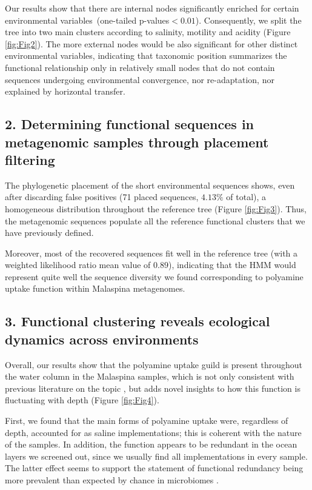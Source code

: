 \documentclass[Journal,letterpaper,NoLists]{ascelike-new}
\begin{document}
Our results show that there are internal nodes significantly enriched for certain environmental variables~(one-tailed p-values$<0.01$). Consequently, we split the tree into two main clusters according to salinity, motility and acidity (Figure \ref{fig:Fig2}). The more external nodes would be also significant for other distinct environmental variables, indicating that taxonomic position summarizes the functional relationship only in relatively small nodes that do not contain sequences undergoing environmental convergence, nor re-adaptation, nor explained by horizontal transfer.


\subsection{2. Determining functional sequences in metagenomic samples through placement filtering}

The phylogenetic placement of the short environmental sequences shows, even after discarding false positives (71 placed sequences, $4.13\%$ of total), a homogeneous distribution throughout the reference tree (Figure \ref{fig:Fig3}). Thus, the metagenomic sequences populate all the reference functional clusters that we have previously defined.

Moreover, most of the recovered sequences fit well in the reference tree (with a weighted likelihood ratio mean value of $0.89$), indicating that the HMM would represent quite well the sequence diversity we found corresponding to polyamine uptake function within Malaspina metagenomes.


\subsection{3. Functional clustering reveals ecological dynamics across environments}

Overall, our results show that the polyamine uptake guild is present throughout the water column in the Malaspina samples, which is not only consistent with previous literature on the topic \cite{bergauer2018organic}, but adds novel insights to how this function is fluctuating with depth (Figure \ref{fig:Fig4}). 

First, we found that the main forms of polyamine uptake were, regardless of depth, accounted for as saline implementations; this is coherent with the nature of the samples. In addition, the function appears to be redundant in the ocean layers we screened out, since we usually find all implementations in every sample. The latter effect seems to support the statement of functional redundancy being more prevalent than expected by chance in microbiomes \cite{puente2022cross}. 
\end{document}
